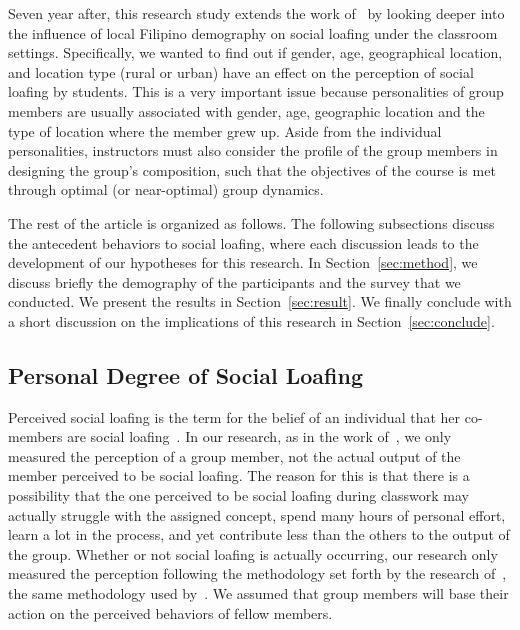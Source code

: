 \documentclass[a4paper,a4paper,BCOR12mm,12pt,abstracton,pointednumbers,tablecaptionabove,footinclude,halfparskip,normalheadings,]{scrartcl}
\begin{document}
Seven year after, this research study extends the work of~\citet{Pabico08} by looking deeper into the influence of local Filipino demography on social loafing under the classroom settings. Specifically, we wanted to find out if gender, age, geographical location, and location type (rural or urban) have an effect on the perception of social loafing by students. This is a very important issue because personalities of group members are usually associated with gender, age, geographic location and the type of location where the member grew up. Aside from the individual personalities, instructors must also consider the profile of the group members in designing the group's composition, such that the objectives of the course is met through optimal (or near-optimal) group dynamics.

The rest of the article is organized as follows. The following subsections discuss the antecedent behaviors to social loafing, where each discussion leads to the development of our hypotheses for this research. In Section~\ref{sec:method}, we discuss briefly the demography of the participants and the survey that we conducted. We present the results in Section~\ref{sec:result}. We finally conclude with a short discussion on the implications of this research in Section~\ref{sec:conclude}.

\subsection{Personal Degree of Social Loafing}

Perceived social loafing is the term for the belief of an individual that her co-members are social loafing~\citep{Comer95}. In our research, as in the work of~\citet{Pabico08}, we only measured the perception of a group member, not the actual output of the member perceived to be social loafing. The reason for this is that there is a possibility that the one perceived to be social loafing during classwork may actually struggle with the assigned concept, spend many hours of personal effort, learn a lot in the process, and yet contribute less than the others to the output of the group. Whether or not social loafing is actually occurring, our research only measured the perception following the methodology set forth by the research of~\citet{Mulvey98}, the same methodology used by~\citet{Pabico08}. We assumed  that group members will base their action on the perceived behaviors of fellow members.
\end{document}
